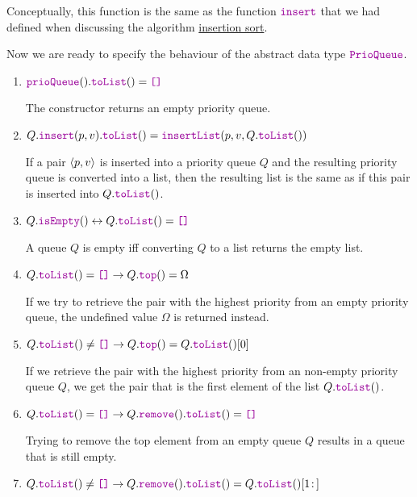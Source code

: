 \begin{Definition}
\begin{enumerate}
\begin{enumerate}
\begin{enumerate}
            \end{enumerate}
            Conceptually, this function is the same as the function $\mytt{insert}$ that we had defined when
            discussing the algorithm \hyperref[sec:insertionSort]{insertion sort}.
      \end{enumerate}
      Now we are ready to specify the behaviour of the abstract data type $\mytt{PrioQueue}$.
      \begin{enumerate}
      \item $\mytt{prioQueue}().\mytt{toList}() = \mytt{[]}$

            The constructor returns an empty priority queue.
      \item $Q.\mytt{insert}(p,v).\mytt{toList}() = \mytt{insertList}(p,v,Q.\mytt{toList}())$

            If a pair $\pair(p,v)$ is inserted into a priority queue $Q$ and the resulting priority queue is
            converted into a list, then the resulting list is the same as if this pair is inserted
            into $Q.\mytt{toList}()$.
      \item $Q.\mytt{isEmpty}() \leftrightarrow Q.\mytt{toList}() = \mytt{[]}$

            A queue $Q$ is empty iff converting $Q$ to a list returns the empty list.
      \item $Q.\mytt{toList}() = \mytt{[]} \rightarrow Q.\mytt{top}() = \Omega$

            If we try to retrieve the pair with the highest priority from an empty priority queue, the
            undefined value $\Omega$ is returned instead.
      \item $Q.\mytt{toList}() \not= \mytt{[]} \rightarrow Q.\mytt{top}() = Q.\mytt{toList}()[0]$

            If we retrieve the  pair with the highest priority from an non-empty priority queue $Q$,
            we get the pair that is the first element of the list $Q.\mytt{toList}()$.

      \item $Q.\mytt{toList}() = \mytt{[]} \rightarrow Q.\mytt{remove}().\mytt{toList}() = \mytt{[]}$

            Trying to remove the top element from an empty queue $Q$ results in a queue that is still empty.
      \item $Q.\mytt{toList}() \not= \mytt{[]} \rightarrow Q.\mytt{remove}().\mytt{toList}() =
        Q.\mytt{toList}()[1\!:\,]$


\end{enumerate}
\end{enumerate}
\end{Definition}
